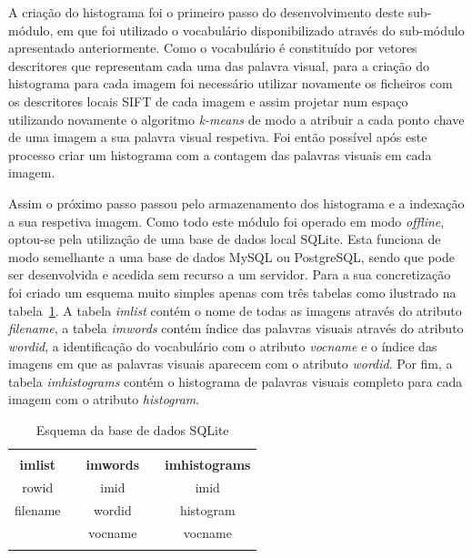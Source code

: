 A criação do histograma foi o primeiro passo do desenvolvimento deste sub-módulo, em que foi utilizado o vocabulário disponibilizado através do sub-módulo apresentado anteriormente. Como o vocabulário é constituído por vetores descritores que representam cada uma das palavra visual, para a criação do histograma para cada imagem foi necessário utilizar novamente os ficheiros com os descritores locais SIFT de cada imagem e assim projetar num espaço utilizando novamente o algoritmo \textit{k-means} de modo a atribuir a cada ponto chave de uma imagem a sua palavra visual respetiva. Foi então possível após este processo criar um histograma com a contagem das palavras visuais em cada imagem.

Assim o próximo passo passou pelo armazenamento dos histograma e a indexação a sua respetiva imagem. Como todo este módulo foi operado em modo \textit{offline}, optou-se pela utilização de uma base de dados local SQLite. Esta funciona de modo semelhante a uma base de dados MySQL ou PostgreSQL, sendo que pode ser desenvolvida e acedida sem recurso a um servidor. Para a sua concretização foi criado um esquema muito simples apenas com três tabelas como ilustrado na tabela~\ref{tab:schemadb}. A tabela \textit{imlist} contém o nome de todas as imagens através do atributo \textit{filename}, a tabela \textit{imwords} contém índice das palavras visuais através do atributo \textit{wordid}, a identificação do vocabulário com o atributo \textit{vocname} e o índice das imagens em que as palavras visuais aparecem com o atributo \textit{wordid}. Por fim, a tabela \textit{imhistograms} contém o histograma de palavras visuais completo para cada imagem com o atributo \textit{histogram}.

\begin{table}[h]
\centering
\begin{tabular}{lcccc}
\multicolumn{5}{l}{} \\ \cline{1-1} \cline{3-3} \cline{5-5} 
\multicolumn{1}{|c|}{\cellcolor[HTML]{C0C0C0}\textbf{imlist}} & \multicolumn{1}{c|}{} & \multicolumn{1}{c|}{\cellcolor[HTML]{C0C0C0}\textbf{imwords}} & \multicolumn{1}{c|}{} & \multicolumn{1}{c|}{\cellcolor[HTML]{C0C0C0}\textbf{imhistograms}} \\ \cline{1-1} \cline{3-3} \cline{5-5} 
\multicolumn{1}{|c|}{rowid} & \multicolumn{1}{c|}{} & \multicolumn{1}{c|}{imid} & \multicolumn{1}{c|}{} & \multicolumn{1}{c|}{imid} \\ \cline{1-1} \cline{3-3} \cline{5-5} 
\multicolumn{1}{|c|}{filename} & \multicolumn{1}{c|}{\multirow{-3}{*}{}} & \multicolumn{1}{c|}{wordid} & \multicolumn{1}{c|}{} & \multicolumn{1}{c|}{histogram} \\ \cline{1-1} \cline{3-3} \cline{5-5} 
 & \multicolumn{1}{l|}{} & \multicolumn{1}{c|}{vocname} & \multicolumn{1}{c|}{\multirow{-4}{*}{}} & \multicolumn{1}{c|}{vocname} \\ \cline{3-3} \cline{5-5} 
\multicolumn{5}{l}{}
\end{tabular}
\caption{Esquema da base de dados SQLite}
\label{tab:schemadb}
\end{table}

